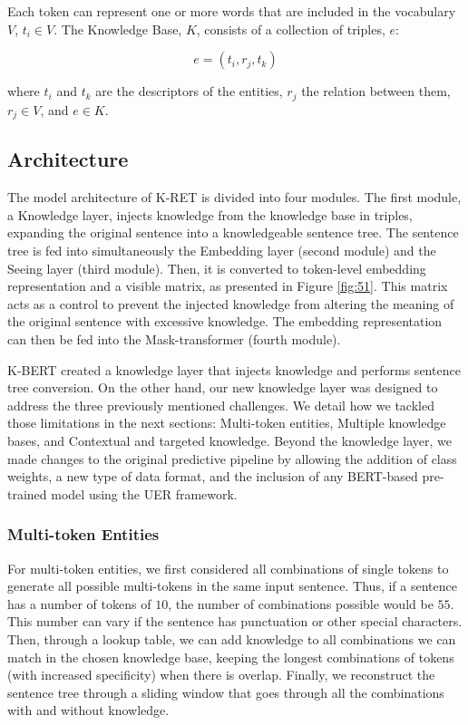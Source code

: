 Each token can represent one or more words that are included in the vocabulary $V$, $t_{i} \in V$.  
The Knowledge Base, $K$, consists of a collection of triples, $e$:

\begin{equation}
e = (t_{i}, r_{j}, t_{k})\label{eq:02}
\end{equation}

where $t_{i}$ and $t_{k}$ are the descriptors of the entities, $r_{j}$ the relation between them, $r_{j} \in V$, and $e \in K$.


\subsection{Architecture}

The model architecture of K-RET is divided into four modules. The first module, a Knowledge layer, injects knowledge from the knowledge base in triples, expanding the original sentence into a knowledgeable sentence tree. The sentence tree is fed into simultaneously the Embedding layer (second module) and the Seeing layer (third module). Then, it is converted to token-level embedding representation and a visible matrix, as presented in Figure \ref{fig:51}. This matrix acts as a control to prevent the injected knowledge from altering the meaning of the original sentence with excessive knowledge. The embedding representation can then be fed into the Mask-transformer (fourth module). 

K-BERT created a knowledge layer that injects knowledge and performs sentence tree conversion. On the other hand, our new knowledge layer was designed to address the three previously mentioned challenges. We detail how we tackled those limitations in the next sections: Multi-token entities, Multiple knowledge bases, and Contextual and targeted knowledge. Beyond the knowledge layer, we made changes to the original predictive pipeline by allowing the addition of class weights, a new type of data format, and the inclusion of any BERT-based pre-trained model using the UER framework.


\subsubsection{Multi-token Entities}

For multi-token entities, we first considered all combinations of single tokens to generate all possible multi-tokens in the same input sentence. Thus, if a sentence has a number of tokens of $10$, the number of combinations possible would be $55$. This number can vary if the sentence has punctuation or other special characters. Then, through a lookup table, we can add knowledge to all combinations we can match in the chosen knowledge base, keeping the longest combinations of tokens (with increased specificity) when there is overlap. Finally, we reconstruct the sentence tree through a sliding window that goes through all the combinations with and without knowledge. 

